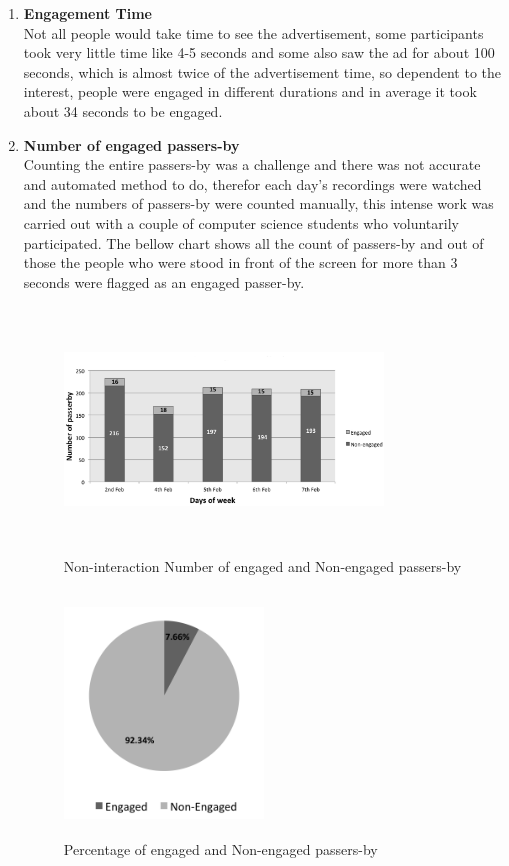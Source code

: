 \begin{enumerate}
\item \textbf{Engagement Time} \\
Not all people would take time to see the advertisement, some participants took very little time like 4-5 seconds and some also saw the ad for about 100 seconds, which is almost twice of the advertisement time, so dependent to the interest, people were engaged in different durations and in average it took about 34 seconds to be engaged.


\item \textbf{Number of engaged passers-by} \\
Counting the entire passers-by was a challenge and there was not accurate and automated method to do, therefor each day’s recordings were watched and the numbers of passers-by were counted manually, this intense work was carried out with a couple of computer science students who voluntarily participated.  
The bellow chart shows all the count of passers-by and out of those the people who were stood in front of the screen for more than 3 seconds were flagged as an engaged passer-by.



\begin{figure}[H]
    \centering
    \includegraphics[width=0.8\textwidth,height=6.5cm]{Figures/8/non_inter_findings/non_inter_engage_day}
    \caption{Non-interaction Number of engaged and Non-engaged passers-by}%
    \label{fig:Nonengagedandengagedby}%
\end{figure}

\begin{figure}[H]
    \centering
    \includegraphics[width=0.5\textwidth,height=6.5cm]{Figures/8/non_inter_findings/non_eng_percentage}
    \caption{Percentage of engaged and Non-engaged passers-by}%
    \label{fig:Nonengagedpasserbypercentage}%
\end{figure}



\end{enumerate}
